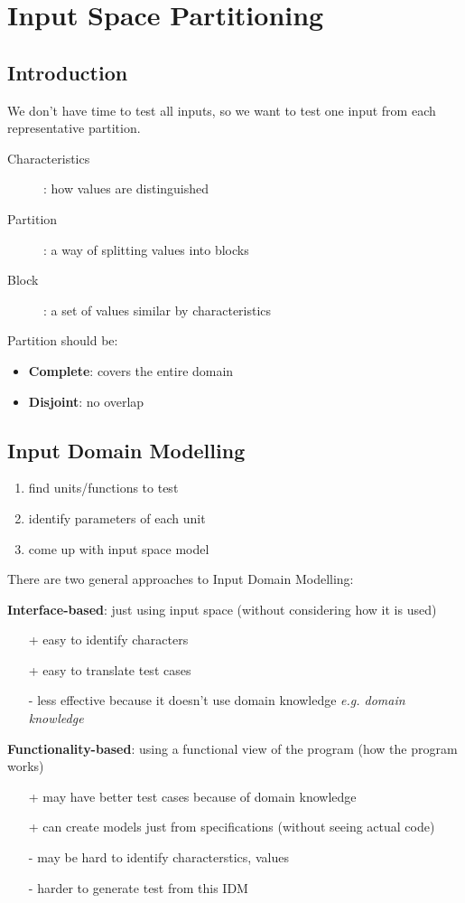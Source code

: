 \documentclass[]{article}
\theoremstyle{definition}
\begin{document}
	\section{Input Space Partitioning}
	\subsection{Introduction}
	We don't have time to test all inputs, so we want to test one input from each representative partition. 
	\begin{description}
		\item[Characteristics]: how values are distinguished
		\item[Partition]: a way of splitting values into blocks
		\item[Block]: a set of values similar by characteristics
	\end{description}
	
	Partition should be:
	\begin{itemize}
		\item \textbf{Complete}: covers the entire domain
		\item \textbf{Disjoint}: no overlap
	\end{itemize}
	
	\subsection{Input Domain Modelling}
	\begin{enumerate}
		\item find units/functions to test
		\item identify parameters of each unit
		\item come up with input space model
	\end{enumerate}
	There are two general approaches to Input Domain Modelling:

	\textbf{Interface-based}: just using input space (without considering how it is used)
	\begin{itemize}
		\item[+] easy to identify characters
		\item[+] easy to translate test cases
		\item[-] less effective because it doesn't use domain knowledge \textit{e.g. domain knowledge}
	\end{itemize}

	\textbf{Functionality-based}: using a functional view of the program (how the program works)
	\begin{itemize}
		\item[+] may have better test cases because of domain knowledge
		\item[+] can create models just from specifications (without seeing actual code)
		\item[-] may be hard to identify characterstics, values
		\item[-] harder to generate test from this IDM
	\end{itemize}
	
\end{document}
